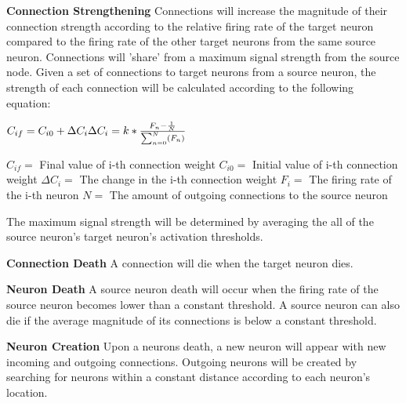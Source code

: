 \documentclass{article} %
\begin{document}
        \textbf{Connection Strengthening} Connections will increase the magnitude of their connection strength according to the relative firing rate of the target neuron compared to the firing rate of the other target neurons from the same source neuron. Connections will 'share' from a maximum signal strength from the source node.\newline
        Given a set of connections to target neurons from a source neuron, the strength of each connection will be calculated according to the following equation:\newline
        \begin{center}
        \begin{math}
            C_{if} = C_{i0} + \Delta C_{i}\newline
            \Delta C_i = k * \frac{F_n - \frac{1}{N}}{\sum_{n=0}^{N} (F_n)}\newline\newline
        \end{math}
        \end{center}
            $C_{if} = $ Final value of i-th connection weight\newline
            $C_{i0} = $ Initial value of i-th connection weight\newline
            $\Delta C_{i} = $ The change in the i-th connection weight\newline
            $F_{i} = $ The firing rate of the i-th neuron\newline
            $N = $ The amount of outgoing connections to the source neuron\newline

        The maximum signal strength will be determined by averaging the all of the source neuron's target neuron's activation thresholds.
        
        \textbf{Connection Death} A connection will die when the target neuron dies.\newline

        \textbf{Neuron Death} A source neuron death will occur when the firing rate of the source neuron becomes lower than a constant threshold. A source neuron can also die if the average magnitude of its connections is below a constant threshold.\newline

        \textbf{Neuron Creation} Upon a neurons death, a new neuron will appear with new incoming and outgoing connections. Outgoing neurons will be created by searching for neurons within a constant distance according to each neuron's location.
\end{document}
